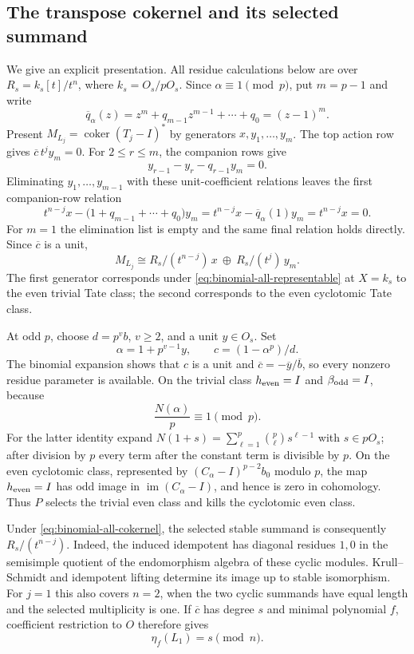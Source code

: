 \subsection{The transpose cokernel and its selected summand}

We give an explicit presentation.
All residue calculations below are over
$R_s=k_s[t]/t^n$, where $k_s=O_s/pO_s$.
Since $\alpha\equiv1\pmod p$, put $m=p-1$ and write
\[
 \overline q_\alpha(z)
 =z^m+q_{m-1}z^{m-1}+\cdots+q_0=(z-1)^m.
\]
Present $M_{L_j}=\operatorname{coker}(T_j-I)^*$ by
generators $x,y_1,\ldots,y_m$.
The top action row gives $\overline c\,t^j y_m=0$.
For $2\le r\le m$, the companion rows give
\[
 y_{r-1}-y_r-q_{r-1}y_m=0.
\]
Eliminating $y_1,\ldots,y_{m-1}$ with these unit-coefficient
relations leaves the first companion-row relation
\[
 t^{n-j}x-\bigl(1+q_{m-1}+\cdots+q_0\bigr)y_m
 =t^{n-j}x-\overline q_\alpha(1)y_m=t^{n-j}x=0.
\]
For $m=1$ the elimination list is empty and the same final
relation holds directly.  Since $\overline c$ is a unit,
\begin{equation}\label{eq:binomial-all-cokernel}
 M_{L_j}\cong R_s/(t^{n-j})\,x\ \oplus\
                    R_s/(t^j)\,y_m.
\end{equation}
The first generator corresponds under
\eqref{eq:binomial-all-representable} at $X=k_s$ to the
even trivial Tate class; the second corresponds to the
even cyclotomic Tate class.

At odd $p$, choose $d=p^v b$, $v\ge2$, and a unit $y\in O_s$.
Set
\[
 \alpha=1+p^{v-1}y,\qquad c=(1-\alpha^p)/d.
\]
The binomial expansion shows that $c$ is a unit and
$\overline c=-\overline y/\overline b$, so every nonzero
residue parameter is available.
On the trivial class $h_{\rm even}=I$ and
$\beta_{\rm odd}=I$, because
\[
 \frac{N(\alpha)}p\equiv1\pmod p.
\]
For the latter identity expand
$N(1+s)=\sum_{\ell=1}^p\binom p\ell s^{\ell-1}$ with
$s\in pO_s$; after division by $p$ every term after the
constant term is divisible by $p$.
On the even cyclotomic class, represented by
$(C_\alpha-I)^{p-2}b_0$ modulo $p$, the map $h_{\rm even}=I$
has odd image in $\operatorname{im}(C_\alpha-I)$, and hence
is zero in cohomology.
Thus $P$ selects the trivial even class and kills the
cyclotomic even class.

Under \eqref{eq:binomial-all-cokernel}, the selected stable
summand is consequently $R_s/(t^{n-j})$.
Indeed, the induced idempotent has diagonal residues $1,0$
in the semisimple quotient of the endomorphism algebra
of these cyclic modules.  Krull--Schmidt and idempotent
lifting determine its image up to stable isomorphism.
For $j=1$ this also covers $n=2$, when the two cyclic
summands have equal length and the selected multiplicity
is one.  If $\overline c$ has degree $s$ and minimal
polynomial $f$, coefficient restriction to $O$ therefore gives
\begin{equation}\label{eq:binomial-all-odd-value}
 \eta_f(L_1)=s\pmod n.
\end{equation}

